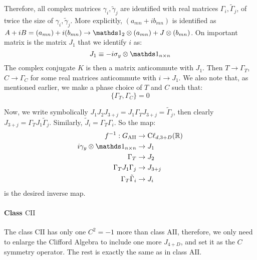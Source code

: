 Therefore, all complex matrices $\gamma_i,\tilde{\gamma}_j$ are identified with
real matrices $\Gamma_i,\tilde{\Gamma}_j$, of twice the size of
$\gamma_i,\tilde{\gamma}_j$. More explicitly, $(a_{mn}+i b_{mn})$ is identified
as $A+iB = (a_{mn})+i(b_{mn}) \to \id_2\otimes(a_{mn})+J\otimes(b_{mn})$. On
important matrix is the matrix $J_1$ that we identify $i$ as:
\begin{equation}
    J_1 \equiv -i\sigma_y \otimes \id_{n\times n}
\end{equation}
The complex conjugate $K$ is then a matrix anticommute with $J_1$.  Then $T\to
\Gamma_T$, $C\to \Gamma_C$ for some real matrices anticommute with $i\to J_1$.
We also note that, as mentioned earlier, we make a phase choice of $T$ and $C$
such that:
\begin{equation}
    \{\Gamma_T,\Gamma_C\} = 0
\end{equation}

Now, we write symbolically $J_1J_2J_{3+j} = J_1 \Gamma_T J_{3+j} =
\tilde{\Gamma}_j$, then clearly $J_{3+j} = \Gamma_T J_1\tilde{\Gamma}_j$.
Similarly, $\tilde{J}_i = \Gamma_T\Gamma_i$. So the map:
\begin{align}
    f^{-1}: G_{\mathrm{AII}} &\to \mathrm{C\ell}_{d,3+D}(\R) \\
    i\gamma_y \otimes \id_{n\times n} &\to J_1 \nonumber\\
    \Gamma_T &\to J_2 \nonumber\\
    \Gamma_TJ_1\Gamma_j &\to J_{3+j} \nonumber\\
    \Gamma_T\tilde{\Gamma}_i &\to J_{i} \nonumber
\end{align}
is the desired inverse map.

\paragraph{Class $\mathrm{CII}$} The class $\mathrm{CII}$ has only one $C^2=-1$
more than class $\mathrm{AII}$, therefore, we only need to enlarge the Clifford
Algebra to include one more $J_{4+D}$, and set it as the $C$ symmetry operator.
The rest is exactly the same as in class $\mathrm{AII}$.

